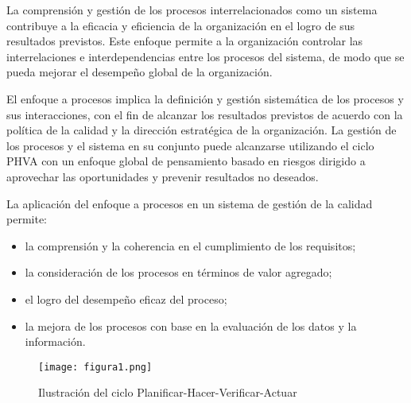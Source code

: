 		\par \noindent	
			La comprensión y gestión de los procesos interrelacionados como un sistema contribuye a la eficacia
			y eficiencia de la organización en el logro de sus resultados previstos. Este enfoque permite a la
			organización controlar las interrelaciones e interdependencias entre los procesos del sistema, de modo
			que se pueda mejorar el desempeño global de la organización.
		
\newpage
\thispagestyle{plain}
		
		\par \noindent
			El enfoque a procesos implica la definición y gestión sistemática de los procesos y sus interacciones,
			con el fin de alcanzar los resultados previstos de acuerdo con la política de la calidad y la dirección
			estratégica de la organización. La gestión de los procesos y el sistema en su conjunto puede alcanzarse
			utilizando el ciclo PHVA con un enfoque global de pensamiento basado en riesgos dirigido a aprovechar las oportunidades y prevenir resultados no deseados.
		
		\par \noindent
			La aplicación del enfoque a procesos en un sistema de gestión de la calidad permite:
			
		\begin{itemize}
			
			\item la comprensión y la coherencia en el cumplimiento de los requisitos;
			
			\item la consideración de los procesos en términos de valor agregado;
			
			\item el logro del desempeño eficaz del proceso;
			
			\item la mejora de los procesos con base en la evaluación de los datos y la información.
			
		\end{itemize}

		\begin{figure}[h]
			\centering
			\texttt{[image: figura1.png]}
			\caption{Ilustración del ciclo Planificar-Hacer-Verificar-Actuar}
		\end{figure}

\newpage
\thispagestyle{plain}

